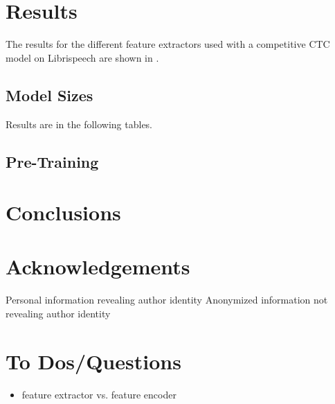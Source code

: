 \documentclass{INTERSPEECH2023}
\begin{document}
\section{Results}
The results for the different feature extractors used with a competitive \gls{CTC} model on Librispeech are shown in .


\subsection{Model Sizes}
Results are in the following tables.





\subsection{\wvtwo Pre-Training}


\section{Conclusions}

\section{Acknowledgements}

\ifinterspeechfinal
     Personal information revealing author identity
\else
     Anonymized information not revealing author identity
\fi

\section{To Dos/Questions}
\begin{itemize}
  \item \wvtwo feature extractor vs. feature encoder
\end{itemize}



\end{document}

